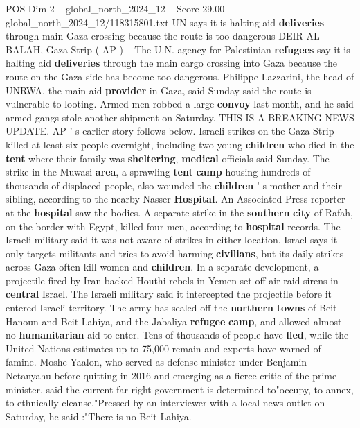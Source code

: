 \begin{textsample}{POS Dim 2 – global\_north\_2024\_12 – Score 29.00 – global\_north\_2024\_12/118315801.txt}  \label{ex:f2_pos_189}
UN says it is halting aid \textbf{deliveries} through main Gaza crossing because the route is too dangerous DEIR AL-BALAH, Gaza Strip ( AP ) -- The U.N. agency for Palestinian \textbf{refugees} say it is halting aid \textbf{deliveries} through the main cargo crossing into Gaza because the route on the Gaza side has become too dangerous.
Philippe Lazzarini, the head of UNRWA, the main aid \textbf{provider} in Gaza, said Sunday said the route is vulnerable to looting.
Armed men robbed a large \textbf{convoy} last month, and he said armed gangs stole another shipment on Saturday.
THIS IS A BREAKING NEWS UPDATE.
AP ' s earlier story follows below.
Israeli strikes on the Gaza Strip killed at least six people overnight, including two young \textbf{children} who died in the \textbf{tent} where their family was \textbf{sheltering}, \textbf{medical} officials said Sunday.
The strike in the Muwasi \textbf{area}, a sprawling \textbf{tent} \textbf{camp} housing hundreds of thousands of displaced people, also wounded the \textbf{children} ' s mother and their sibling, according to the nearby Nasser \textbf{Hospital}.
An Associated Press reporter at the \textbf{hospital} saw the bodies.
A separate strike in the \textbf{southern} \textbf{city} of Rafah, on the border with Egypt, killed four men, according to \textbf{hospital} records.
The Israeli military said it was not aware of strikes in either location.
Israel says it only targets militants and tries to avoid harming \textbf{civilians}, but its daily strikes across Gaza often kill women and \textbf{children}.
In a separate development, a projectile fired by Iran-backed Houthi rebels in Yemen set off air raid sirens in \textbf{central} Israel.
The Israeli military said it intercepted the projectile before it entered Israeli territory.
The army has sealed off the \textbf{northern} \textbf{towns} of Beit Hanoun and Beit Lahiya, and the Jabaliya \textbf{refugee} \textbf{camp}, and allowed almost no \textbf{humanitarian} aid to enter.
Tens of thousands of people have \textbf{fled}, while the United Nations estimates up to 75,000 remain and experts have warned of famine.
Moshe Yaalon, who served as defense minister under Benjamin Netanyahu before quitting in 2016 and emerging as a fierce critic of the prime minister, said the current far-right government is determined to"occupy, to annex, to ethnically cleanse."Pressed by an interviewer with a local news outlet on Saturday, he said :"There is no Beit Lahiya.

\end{textsample}
